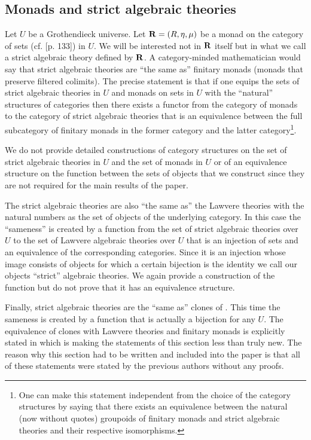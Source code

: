 \documentclass[11pt]{article}
\begin{document}
\subsection{Monads and strict algebraic theories}
%

Let $U$ be a Grothendieck universe. Let ${\bf R}=(R,\eta,\mu)$ be a monad on the category of sets (cf. \cite{MacLane}[p. 133]) in $U$. We will be interested not in ${\bf R}$ itself but in what we call a strict algebraic theory defined by ${\bf R}$. A category-minded mathematician would say that strict algebraic theories are ``the same as'' finitary monads (monads that preserve filtered colimits). The precise statement is that if one equips the sets of strict algebraic theories in $U$ and monads on sets in $U$ with the ``natural'' structures of categories then there exists a functor from the  category of monads to the category of strict algebraic theories that is an equivalence between the full subcategory of finitary monads in the former category and the latter category\footnote{One can make this statement independent from the choice of the category structures by saying that there exists an equivalence between the natural (now without quotes) groupoids of finitary monads and strict algebraic theories and their respective isomorphisms. }. 

We do not provide detailed constructions of category structures on the set of strict algebraic theories in $U$ and the set of monads in $U$ or of an equivalence structure on the function between the sets of objects that we construct since they are not required for the main results of the paper. 

The strict algebraic theories are also ``the same as'' the Lawvere theories with the natural numbers as the set of objects of the underlying category. In this case the ``sameness'' is created by a function from the set of strict algebraic theories over $U$ to the set of Lawvere algebraic theories over $U$ that is an injection of sets and an equivalence of the corresponding categories. Since it is an injection whose image consists of objects for which a certain bijection is the identity we call our objects ``strict'' algebraic theories. We again provide a construction of the function but do not prove that it has an equivalence structure. 

Finally, strict algebraic theories are the ``same as'' clones of \cite[Section 3]{FPT}. This time the sameness is created by a function that is actually a bijection for any $U$. The equivalence of clones with Lawvere theories and finitary monads is explicitly stated in \cite[Section 3]{FPT} which is making the statements of this section less than truly new. The reason why this section had to be written and included into the paper is that all of these statements were stated by the previous authors without any proofs. 
\end{document}
